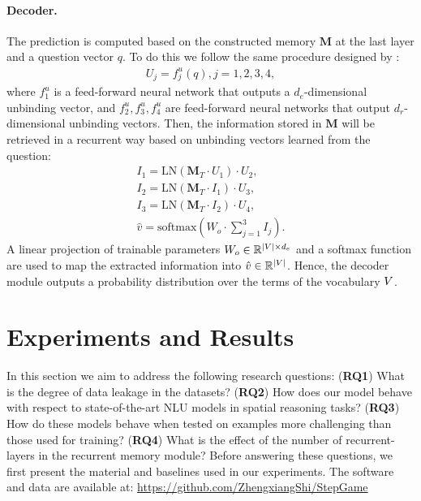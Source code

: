 \documentclass[letterpaper]{article} \usepackage{aaai22}  \usepackage{times}  \usepackage{helvet}  \usepackage{courier}  \usepackage[hyphens]{url}  \usepackage{graphicx} \urlstyle{rm} \def\UrlFont{\rm}  \usepackage{natbib}  \usepackage{caption} \DeclareCaptionStyle{ruled}{labelfont=normalfont,labelsep=colon,strut=off} \frenchspacing  \setlength{\pdfpagewidth}{8.5in}  \setlength{\pdfpageheight}{11in}  \usepackage{algorithm}
\begin{document}
\paragraph{Decoder.} The prediction is computed based on the constructed memory $\boldsymbol{M}$ at the last layer and a question vector $q$. To do this we follow the same procedure designed by \citet{schlag2018learning}:
\begin{align}U_j=f_j^{u}(q), j=1,2,3,4,
\end{align}
where $f_1^{u}$ is a feed-forward neural network that outputs a $d_e$-dimensional unbinding vector, and $f_2^{u},f_3^{u},f_4^{u}$ are feed-forward neural networks that output $d_r$-dimensional unbinding vectors. Then, the information stored in $\boldsymbol{M}$ will be retrieved in a recurrent way based on unbinding vectors learned from the question:
\begin{align}I_1=\text{LN}(\boldsymbol{M}_T\cdot U_1)\cdot U_2, \\I_2=\text{LN}(\boldsymbol{M}_T\cdot I_1)\cdot U_3, \\I_3=\text{LN}(\boldsymbol{M}_T\cdot I_2)\cdot U_4, \\\hat{v}=\text{softmax}(W_o \cdot \sum_{j=1}^{3} I_j).
\end{align}
A linear projection of trainable parameters $W_o \in \mathbb{R}^{\*|V| \times d_e}$ and a softmax function are used to map the extracted information into $\hat{v} \in \mathbb{R}^{\*|V|}$. Hence, the decoder module outputs a probability distribution over the terms of the vocabulary $\*V$.




 
\section{Experiments and Results}
In this section we aim to address the following research questions:
(\textbf{RQ1}) What is the degree of data leakage in the datasets?
(\textbf{RQ2}) How does our model behave with respect to state-of-the-art NLU models in spatial reasoning tasks? 
(\textbf{RQ3}) How do these models behave when tested on examples more challenging than those used for training? 
(\textbf{RQ4}) What is the effect of the number of recurrent-layers in the recurrent memory module?
Before answering these questions, we first present the material and baselines used in our experiments.
The software and data are available at: \url{https://github.com/ZhengxiangShi/StepGame}
\end{document}
